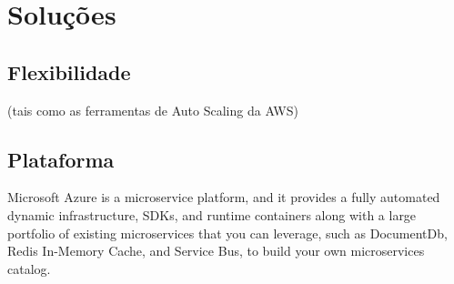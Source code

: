 \chapter{Soluções}\label{chapter-solucoes}

\section{Flexibilidade}
(tais como as ferramentas de Auto Scaling da AWS)

\section{Plataforma}
Microsoft Azure is a microservice platform, and it provides a fully automated dynamic infrastructure, SDKs, and runtime containers along with a large portfolio of existing microservices that you can leverage, such as DocumentDb, Redis In-Memory Cache, and Service Bus, to build your own microservices catalog. \cite{Familiar2015}
